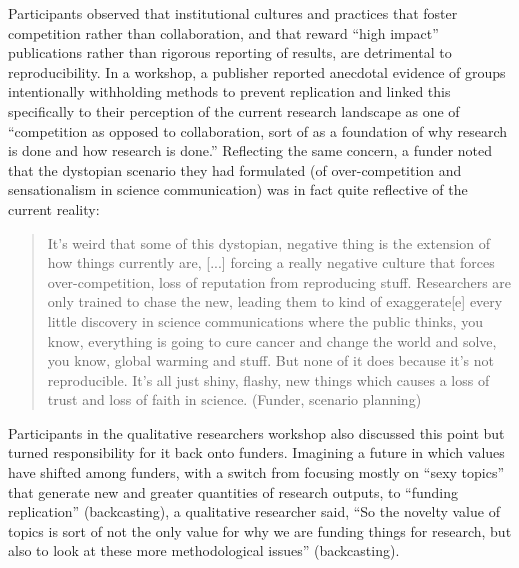 \documentclass[authordate, meta]{jote-new-article}
\begin{document}
	Participants observed that institutional cultures and practices that foster competition rather than collaboration, and that reward “high impact” publications rather than rigorous reporting of results, are detrimental to reproducibility. In a workshop, a publisher reported anecdotal evidence of groups intentionally withholding methods to prevent replication and linked this specifically to their perception of the current research landscape as one of “competition as opposed to collaboration, sort of as a foundation of why research is done and how research is done.” Reflecting the same concern, a funder noted that the dystopian scenario they had formulated (of over-competition and sensationalism in science communication) was in fact quite reflective of the current reality:



	\begin{quote}It's weird that some of this dystopian, negative thing is the extension of how things currently are, [...] forcing a really negative culture that forces over-competition, loss of reputation from reproducing stuff. Researchers are only trained to chase the new, leading them to kind of exaggerate[e] every little discovery in science communications where the public thinks, you know, everything is going to cure cancer and change the world and solve, you know, global warming and stuff. But none of it does because it's not reproducible. It's all just shiny, flashy, new things which causes a loss of trust and loss of faith in science. (Funder, scenario planning)\end{quote}



	Participants in the qualitative researchers workshop also discussed this point but turned responsibility for it back onto funders. Imagining a future in which values have shifted among funders, with a switch from focusing mostly on “sexy topics” that generate new and greater quantities of research outputs, to “funding replication” (backcasting), a qualitative researcher said, “So the novelty value of topics is sort of not the only value for why we are funding things for research, but also to look at these more methodological issues” (backcasting).
\end{document}
